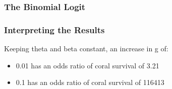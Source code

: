 \begin{frame}\frametitle{The Binomial Logit}
{\fontsize{8}{3} \color{RBlue} }
\end{frame}

\begin{frame}\frametitle{Interpreting the Results}
Keeping theta and beta constant, an increase in g of:
\begin{itemize}
\item 0.01 has an odds ratio of coral survival of 3.21\\
\item 0.1 has an odds ratio of coral survival of 116413
\end{itemize}
\end{frame}

